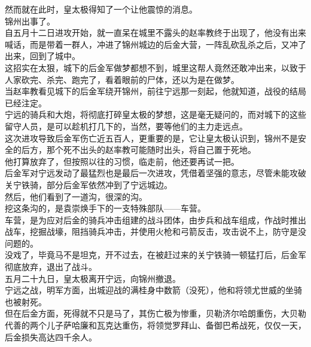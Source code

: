 \begin{multicols}{\theparacolNo}
然而就在此时，皇太极得知了一个让他震惊的消息。\\

锦州出事了。\\

自五月十二日进攻开始，就一直呆在城里不露头的赵率教终于出现了，他没有出来喊话，而是带着一群人，冲进了锦州城边的后金大营，一阵乱砍乱杀之后，又冲了出来，回到了城中。\\

这招实在太狠，城下的后金军做梦都想不到，城里这帮人竟然还敢冲出来，以致于人家砍完、杀完、跑完了，看着眼前的尸体，还以为是在做梦。\\

当赵率教看见城下的后金军绕开锦州，前往宁远那一刻起，他就知道，战役的结局已经注定。\\

宁远的骑兵和大炮，将彻底打碎皇太极的梦想，这是毫无疑问的，而对城下的这些留守人员，是可以趁机打几下的，当然，要等他们的主力走远点。\\

这次进攻导致后金军伤亡近五百人，更重要的是，它让皇太极认识到，锦州不是安全的后方，那个死不出头的赵率教可能随时出头，将自己置于死地。\\

他打算放弃了，但按照以往的习惯，临走前，他还要再试一把。\\

后金军对宁远发动了最猛烈也是最后一次进攻，凭借着坚强的意志，尽管未能攻破关宁铁骑，部分后金军依然冲到了宁远城边。\\

然后，他们看到了一道沟，很深的沟。\\

挖这条沟的，是袁崇焕手下的一支特殊部队——车营。\\

车营，是为应对后金的骑兵冲击组建的战斗团体，由步兵和战车组成，作战时推出战车，挖掘战壕，阻挡骑兵冲击，并使用火枪和弓箭反击，攻击说不上，防守是没问题的。\\

没戏了，毕竟马不是坦克，开不过去，在被赶过来的关宁铁骑一顿猛打后，后金军彻底放弃，退出了战斗。\\

五月二十九日，皇太极离开宁远，向锦州撤退。\\

宁远之战，明军方面，出城迎战的满桂身中数箭（没死），他和将领尤世威的坐骑也被射死。\\

但在后金方面，死得就不只是马了，其伤亡极为惨重，贝勒济尔哈朗重伤，大贝勒代善的两个儿子萨哈廉和瓦克达重伤，将领觉罗拜山、备御巴希战死，仅仅一天，后金损失高达四千余人。\\


\end{multicols}
